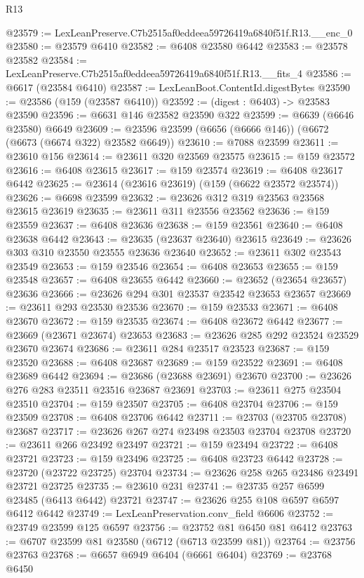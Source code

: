\begin{lexlean}{R13}
\begin{coremodule}
@23579 := LexLeanPreserve.C7b2515af0eddeea59726419a6840f51f.R13.__enc_0
@23580 := @23579 @6410
@23582 := @6408 @23580 @6442
@23583 := @23578 @23582
@23584 := LexLeanPreserve.C7b2515af0eddeea59726419a6840f51f.R13.__fits_4
@23586 := @6617 (@23584 @6410)
@23587 := LexLeanBoot.ContentId.digestBytes
@23590 := @23586 (@159 (@23587 @6410))
@23592 := (digest : @6403) -> @23583 @23590
@23596 := @6631 @146 @23582 @23590 @322
@23599 := @6639 (@6646 @23580) @6649
@23609 := @23596 @23599 (@6656 (@6666 @146)) (@6672 (@6673 (@6674 @322) @23582 @6649))
@23610 := @7088 @23599
@23611 := @23610 @156
@23614 := @23611 @320 @23569 @23575
@23615 := @159 @23572
@23616 := @6408 @23615
@23617 := @159 @23574
@23619 := @6408 @23617 @6442
@23625 := @23614 (@23616 @23619) (@159 (@6622 @23572 @23574))
@23626 := @6698 @23599
@23632 := @23626 @312 @319 @23563 @23568 @23615 @23619
@23635 := @23611 @311 @23556 @23562
@23636 := @159 @23559
@23637 := @6408 @23636
@23638 := @159 @23561
@23640 := @6408 @23638 @6442
@23643 := @23635 (@23637 @23640) @23615
@23649 := @23626 @303 @310 @23550 @23555 @23636 @23640
@23652 := @23611 @302 @23543 @23549
@23653 := @159 @23546
@23654 := @6408 @23653
@23655 := @159 @23548
@23657 := @6408 @23655 @6442
@23660 := @23652 (@23654 @23657) @23636
@23666 := @23626 @294 @301 @23537 @23542 @23653 @23657
@23669 := @23611 @293 @23530 @23536
@23670 := @159 @23533
@23671 := @6408 @23670
@23672 := @159 @23535
@23674 := @6408 @23672 @6442
@23677 := @23669 (@23671 @23674) @23653
@23683 := @23626 @285 @292 @23524 @23529 @23670 @23674
@23686 := @23611 @284 @23517 @23523
@23687 := @159 @23520
@23688 := @6408 @23687
@23689 := @159 @23522
@23691 := @6408 @23689 @6442
@23694 := @23686 (@23688 @23691) @23670
@23700 := @23626 @276 @283 @23511 @23516 @23687 @23691
@23703 := @23611 @275 @23504 @23510
@23704 := @159 @23507
@23705 := @6408 @23704
@23706 := @159 @23509
@23708 := @6408 @23706 @6442
@23711 := @23703 (@23705 @23708) @23687
@23717 := @23626 @267 @274 @23498 @23503 @23704 @23708
@23720 := @23611 @266 @23492 @23497
@23721 := @159 @23494
@23722 := @6408 @23721
@23723 := @159 @23496
@23725 := @6408 @23723 @6442
@23728 := @23720 (@23722 @23725) @23704
@23734 := @23626 @258 @265 @23486 @23491 @23721 @23725
@23735 := @23610 @231
@23741 := @23735 @257 @6599 @23485 (@6413 @6442) @23721
@23747 := @23626 @255 @108 @6597 @6597 @6412 @6442
@23749 := LexLeanPreservation.conv_field @6606
@23752 := @23749 @23599 @125 @6597
@23756 := @23752 @81 @6450 @81 @6412
@23763 := @6707 @23599 @81 @23580 (@6712 (@6713 @23599 @81))
@23764 := @23756 @23763
@23768 := @6657 @6949 @6404 (@6661 @6404)
@23769 := @23768 @6450

\end{coremodule}
\end{lexlean}
